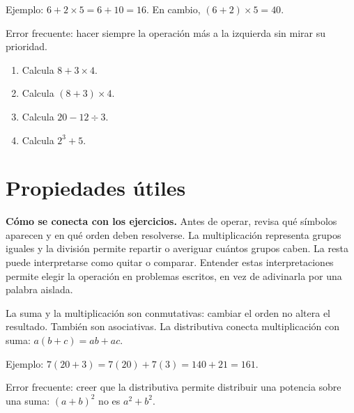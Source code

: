 \documentclass[10pt,oneside,openany]{book}
\begin{document}
\begin{ejemplo}
Ejemplo: $6+2\times5=6+10=16$. En cambio, $(6+2)\times5=40$.
\end{ejemplo}

\begin{ojo}
Error frecuente: hacer siempre la operación más a la izquierda sin mirar su prioridad.
\end{ojo}

\begin{practica}

\begin{enumerate}

\item Calcula $8+3\times4$.

\item Calcula $(8+3)\times4$.

\item Calcula $20-12\div3$.

\item Calcula $2^3+5$.

\end{enumerate}

\end{practica}



\section{Propiedades útiles}

\textbf{Cómo se conecta con los ejercicios.} Antes de operar, revisa qué símbolos aparecen y en qué orden deben resolverse. La multiplicación representa grupos iguales y la división permite repartir o averiguar cuántos grupos caben. La resta puede interpretarse como quitar o comparar. Entender estas interpretaciones permite elegir la operación en problemas escritos, en vez de adivinarla por una palabra aislada.

La suma y la multiplicación son conmutativas: cambiar el orden no altera el resultado. También son asociativas. La distributiva conecta multiplicación con suma: $a(b+c)=ab+ac$.

\begin{ejemplo}
Ejemplo: $7(20+3)=7(20)+7(3)=140+21=161$.
\end{ejemplo}

\begin{ojo}
Error frecuente: creer que la distributiva permite distribuir una potencia sobre una suma: $(a+b)^2$ no es $a^2+b^2$.
\end{ojo}
\end{document}
